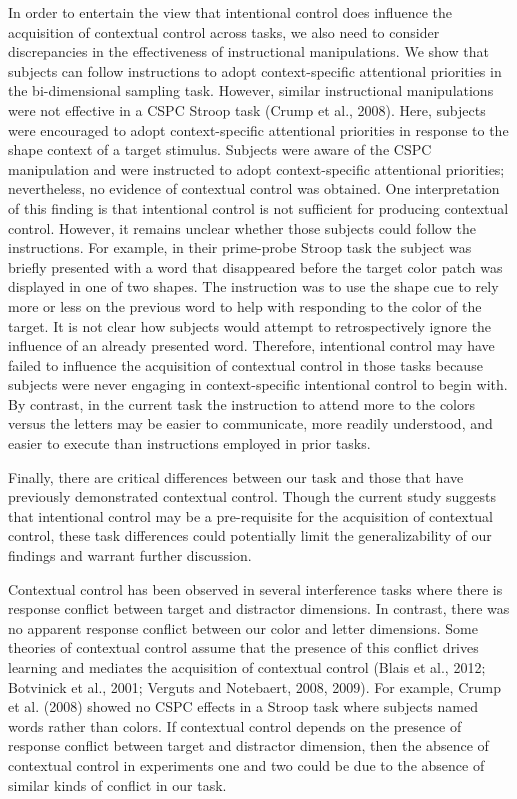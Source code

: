\documentclass[]{DissertateCUNY}
\begin{document}
In order to entertain the view that intentional control does influence
the acquisition of contextual control across tasks, we also need to
consider discrepancies in the effectiveness of instructional
manipulations. We show that subjects can follow instructions to adopt
context-specific attentional priorities in the bi-dimensional sampling
task. However, similar instructional manipulations were not effective in
a CSPC Stroop task (Crump et al., 2008). Here, subjects were encouraged
to adopt context-specific attentional priorities in response to the
shape context of a target stimulus. Subjects were aware of the CSPC
manipulation and were instructed to adopt context-specific attentional
priorities; nevertheless, no evidence of contextual control was
obtained. One interpretation of this finding is that intentional control
is not sufficient for producing contextual control. However, it remains
unclear whether those subjects could follow the instructions. For
example, in their prime-probe Stroop task the subject was briefly
presented with a word that disappeared before the target color patch was
displayed in one of two shapes. The instruction was to use the shape cue
to rely more or less on the previous word to help with responding to the
color of the target. It is not clear how subjects would attempt to
retrospectively ignore the influence of an already presented word.
Therefore, intentional control may have failed to influence the
acquisition of contextual control in those tasks because subjects were
never engaging in context-specific intentional control to begin with. By
contrast, in the current task the instruction to attend more to the
colors versus the letters may be easier to communicate, more readily
understood, and easier to execute than instructions employed in prior
tasks.

Finally, there are critical differences between our task and those that
have previously demonstrated contextual control. Though the current
study suggests that intentional control may be a pre-requisite for the
acquisition of contextual control, these task differences could
potentially limit the generalizability of our findings and warrant
further discussion.

Contextual control has been observed in several interference tasks where
there is response conflict between target and distractor dimensions. In
contrast, there was no apparent response conflict between our color and
letter dimensions. Some theories of contextual control assume that the
presence of this conflict drives learning and mediates the acquisition
of contextual control (Blais et al., 2012; Botvinick et al., 2001;
Verguts and Notebaert, 2008, 2009). For example, Crump et al. (2008)
showed no CSPC effects in a Stroop task where subjects named words
rather than colors. If contextual control depends on the presence of
response conflict between target and distractor dimension, then the
absence of contextual control in experiments one and two could be due to
the absence of similar kinds of conflict in our task.
\end{document}
